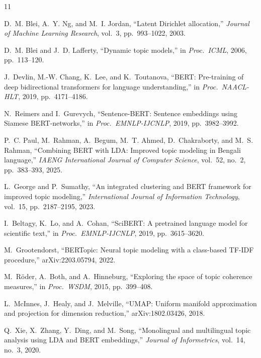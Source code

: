 \documentclass[11pt,a4paper]{article}
\begin{document}
\clearpage
\begin{thebibliography}{11}

D.~M. Blei, A.~Y. Ng, and M.~I. Jordan,
``Latent Dirichlet allocation,''
\emph{Journal of Machine Learning Research}, vol.~3, pp.~993--1022, 2003.

D.~M. Blei and J.~D. Lafferty,
``Dynamic topic models,''
in \emph{Proc.\ ICML}, 2006, pp.~113--120.

J.~Devlin, M.-W. Chang, K.~Lee, and K.~Toutanova,
``BERT: Pre-training of deep bidirectional transformers for language understanding,''
in \emph{Proc.\ NAACL-HLT}, 2019, pp.~4171--4186.

N.~Reimers and I.~Gurevych,
``Sentence-BERT: Sentence embeddings using Siamese BERT-networks,''
in \emph{Proc.\ EMNLP-IJCNLP}, 2019, pp.~3982--3992.

P.~C. Paul, M.~Rahman, A.~Begum, M.~T. Ahmed, D.~Chakraborty, and M.~S. Rahman,
``Combining BERT with LDA: Improved topic modeling in Bengali language,''
\emph{IAENG International Journal of Computer Science}, vol.~52, no.~2, pp.~383--393, 2025.

L.~George and P.~Sumathy,
``An integrated clustering and BERT framework for improved topic modeling,''
\emph{International Journal of Information Technology}, vol.~15, pp.~2187--2195, 2023.

I.~Beltagy, K.~Lo, and A.~Cohan,
``SciBERT: A pretrained language model for scientific text,''
in \emph{Proc.\ EMNLP-IJCNLP}, 2019, pp.~3615--3620.

M.~Grootendorst,
``BERTopic: Neural topic modeling with a class-based TF-IDF procedure,''
arXiv:2203.05794, 2022.

M.~R\"oder, A.~Both, and A.~Hinneburg,
``Exploring the space of topic coherence measures,''
in \emph{Proc.\ WSDM}, 2015, pp.~399--408.

L.~McInnes, J.~Healy, and J.~Melville,
``UMAP: Uniform manifold approximation and projection for dimension reduction,''
arXiv:1802.03426, 2018.

Q.~Xie, X.~Zhang, Y.~Ding, and M.~Song,
``Monolingual and multilingual topic analysis using LDA and BERT embeddings,''
\emph{Journal of Informetrics}, vol.~14, no.~3, 2020.

\end{thebibliography}
\end{document}
